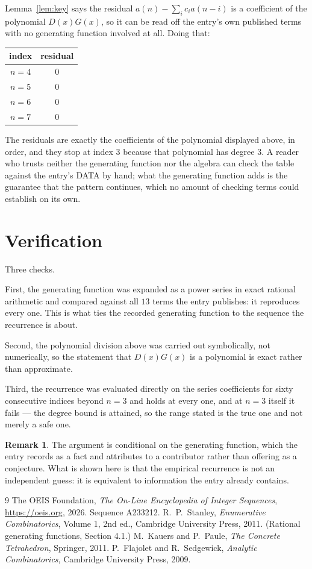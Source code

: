 \documentclass[11pt,a4paper]{article}
\theoremstyle{plain}
\theoremstyle{definition}
\newtheorem{remark}[theorem]{Remark}
\begin{document}
Lemma~\ref{lem:key} says the residual $a(n)-\sum_ic_ia(n-i)$ is a coefficient of the
polynomial $D(x)G(x)$, so it can be read off the entry's own published terms with no
generating function involved at all. Doing that:
\begin{center}
\begin{tabular}{cc}
index & residual \\ \hline
$n=4$ & $0$ \\
$n=5$ & $0$ \\
$n=6$ & $0$ \\
$n=7$ & $0$
\end{tabular}
\end{center}
The residuals are exactly the coefficients of the polynomial displayed above, in order, and
they stop at index $3$ because that polynomial has degree $3$. A reader who trusts
neither the generating function nor the algebra can check the table against the entry's DATA
by hand; what the generating function adds is the guarantee that the pattern continues, which
no amount of checking terms could establish on its own.

\section{Verification}

Three checks.

First, the generating function was expanded as a power series in exact rational arithmetic and
compared against all $13$ terms the entry publishes: it reproduces every one. This is
what ties the recorded generating function to the sequence the recurrence is about.

Second, the polynomial division above was carried out symbolically, not numerically, so the
statement that $D(x)G(x)$ is a polynomial is exact rather than approximate.

Third, the recurrence was evaluated directly on the series coefficients for sixty consecutive
indices beyond $n=3$ and holds at every one, and at $n=3$ itself it fails --- the
degree bound is attained, so the range stated is the true one and not merely a safe one.

\begin{remark}
The argument is conditional on the generating function, which the entry records as a fact and
attributes to a contributor rather than offering as a conjecture. What is shown here is that
the empirical recurrence is not an independent guess: it is equivalent to information the
entry already contains.
\end{remark}

\begin{thebibliography}{9}
 The OEIS Foundation, \emph{The On-Line Encyclopedia of Integer
Sequences}, \url{https://oeis.org}, 2026. Sequence A233212.
 R.~P.~Stanley, \emph{Enumerative Combinatorics}, Volume 1, 2nd ed.,
Cambridge University Press, 2011. (Rational generating functions, Section 4.1.)
 M.~Kauers and P.~Paule, \emph{The Concrete Tetrahedron}, Springer, 2011.
 P.~Flajolet and R.~Sedgewick, \emph{Analytic Combinatorics}, Cambridge
University Press, 2009.
\end{thebibliography}
\end{document}
